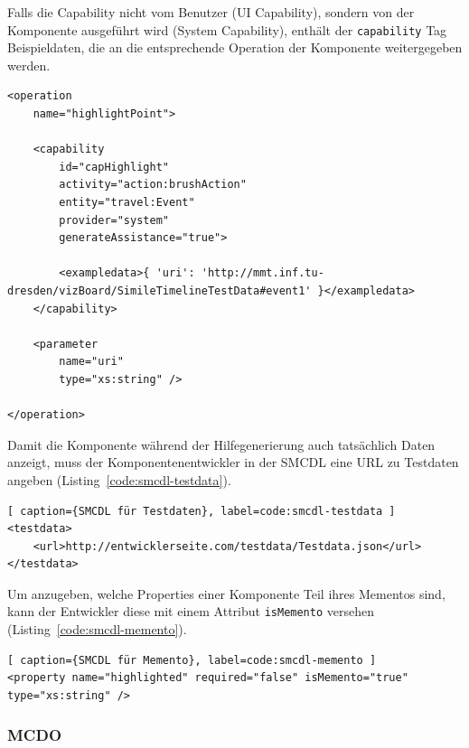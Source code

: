 \documentclass[
	headsepline,
	footsepline,
	fontsize=12pt,
	bibliography=totoc
]{scrbook}
\begin{document}
Falls die Capability nicht vom Benutzer (UI Capability), sondern von der Komponente ausgeführt wird (System Capability), enthält der \texttt{capability} Tag Beispieldaten, die an die entsprechende Operation der Komponente weitergegeben werden.

\lstset{language=XML}
\begin{lstlisting}[caption={SMCDL für System Capability}, label=code:smcdl-system]
<operation
	name="highlightPoint">
	
	<capability
		id="capHighlight"
		activity="action:brushAction"
		entity="travel:Event"
		provider="system"
		generateAssistance="true">
		
		<exampledata>{ 'uri': 'http://mmt.inf.tu-dresden/vizBoard/SimileTimelineTestData#event1' }</exampledata>
	</capability>
	
	<parameter
		name="uri"
		type="xs:string" />
	
</operation>
\end{lstlisting}

Damit die Komponente während der Hilfegenerierung auch tatsächlich Daten anzeigt, muss der Komponentenentwickler in der SMCDL eine URL zu Testdaten angeben (Listing~\ref{code:smcdl-testdata}).

\lstset{language=XML}
\begin{lstlisting}[ caption={SMCDL für Testdaten}, label=code:smcdl-testdata ]
<testdata>
	<url>http://entwicklerseite.com/testdata/Testdata.json</url>
</testdata>
\end{lstlisting}

Um anzugeben, welche Properties einer Komponente Teil ihres Mementos sind, kann der Entwickler diese mit einem Attribut \texttt{isMemento} versehen (Listing~\ref{code:smcdl-memento}).

\lstset{language=XML}
\begin{lstlisting}[ caption={SMCDL für Memento}, label=code:smcdl-memento ]
<property name="highlighted" required="false" isMemento="true" type="xs:string" />
\end{lstlisting}


\subsubsection{MCDO}
\end{document}
